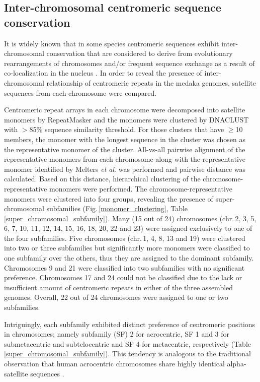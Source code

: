 \subsection*{Inter-chromosomal centromeric sequence conservation}
  It is widely known that in some species centromeric sequences exhibit inter-chromosomal conservation that are considered to derive from evolutionary rearrangements of chromosomes and/or frequent sequence exchange as a result of co-localization in the nucleus \cite{Willard1991}. In order to reveal the presence of inter-chromosomal relationship of centromeric repeats in the medaka genomes, satellite sequences from each chromosome were compared.

  Centromeric repeat arrays in each chromosome were decomposed into satellite monomers by RepeatMasker and the monomers were clustered by DNACLUST \cite{Ghodsi2011} with $>$85\% sequence similarity threshold. For those clusters that have $\geq$10 members, the monomer with the longest sequence in the cluster was chosen as the representative monomer of the cluster. All-vs-all pairwise alignment of the representative monomers from each chromosome along with the representative monomer identified by Melters \textit{et al}. was performed and pairwise distance was calculated. Based on this distance, hierarchical clustering of the chromosome-representative monomers were performed. The chromosome-representative monomers were clustered into four groups, revealing the presence of super-chromosomal subfamilies (Fig.\,\ref{monomer_clustering}, Table\,\ref{super_chromosomal_subfamily}). Many (15 out of 24) chromosomes (chr.\,2, 3, 5, 6, 7, 10, 11, 12, 14, 15, 16, 18, 20, 22 and 23) were assigned exclusively to one of the four subfamilies. Five chromosomes (chr.\,1, 4, 8, 13 and 19) were clustered into two or three subfamilies but significantly more monomers were classified to one subfamily over the others, thus they are assigned to the dominant subfamily. Chromosomes 9 and 21 were classified into two subfamilies with no significant preference. Chromosomes 17 and 24 could not be classified due to the lack or insufficient amount of centromeric repeats in either of the three assembled genomes. Overall, 22 out of 24 chromosomes were assigned to one or two subfamilies.

  Intriguingly, each subfamily exhibited distinct preference of centromeric positions in chromosomes; namely subfamily (SF) 2 for acrocentric, SF 1 and 3 for submetacentric and subtelocentric and SF 4 for metacentric, respectively (Table \ref{super_chromosomal_subfamily}). This tendency is analogous to the traditional observation that human acrocentric chromosomes share highly identical alpha-satellite sequences \cite{Willard1991}.

